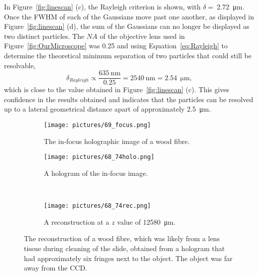 In Figure~\ref{fig:linescan} (c), the Rayleigh criterion is shown, with
$\delta= ~$\SI{2.72}{\micro\meter}. Once the FWHM of each of the Gaussians move past one
another, as displayed in Figure~\ref{fig:linescan} (d), the sum of the
Gaussians can no longer be displayed as two distinct particles. The $NA$ of the
objective lens used in Figure~\ref{fig:OurMicroscope} was 0.25
and using
Equation~\ref{eq:Rayleigh} to determine the theoretical minimum
separation of two particles that could still be resolvable,
\begin{equation}
    \delta_{Rayleigh} \propto \frac{635~\mathrm{nm}}{0.25} = 2540~\mathrm{nm} =
    2.54~\mathrm{\SI{}{\micro\meter}} ,
\end{equation}
which is close to the value obtained in Figure~\ref{fig:linescan} (c).
This gives confidence in the results obtained and indicates that the particles
can be resolved up to a lateral
geometrical distance apart of approximately
\SI{2.5}{\micro\meter}.


\begin{figure}[ht!]
    \begin{center}

        \begin{subfigure}[t]{0.4\textwidth}
            \label{fig:69_focus}
            \texttt{[image: pictures/69\_focus.png]}
            \caption{The in-focus holographic image of a wood fibre.}
        \end{subfigure}
                \hspace*{\fill}
        \begin{subfigure}[t]{0.4\textwidth}
            \label{fig:68_74holo}
            \texttt{[image: pictures/68\_74holo.png]}
            \caption{A hologram of the in-focus image.}
        \end{subfigure}
        \\
        \begin{subfigure}[t]{\textwidth}
            \label{fig:68_74rec}
            \texttt{[image: pictures/68\_74rec.png]}
            \caption{A reconstruction at a $z$ value of
                \SI{12580}{\micro\meter}.}
        \end{subfigure}


    \end{center}
    \caption{%
        The reconstruction of a wood fibre, which was likely from a lens tissue
        during cleaning of the slide, obtained from a hologram that had
        approximately six fringes next to the object. The object was far away from
        the CCD.
    }%
    \label{fig:68_74}
\end{figure}



